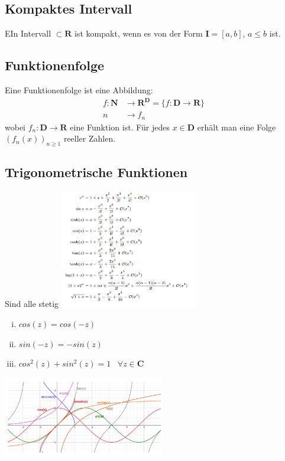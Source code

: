 \documentclass[8pt]{article}
\begin{document}
\begin{multicols*}{3}
\subsection{Kompaktes Intervall}

EIn Intervall $\subset \mathbf{R}$ ist kompakt, wenn es von der Form $\mathbf{I} = [a, b]$,
$a \leq b$ ist.

\subsection{Funktionenfolge}

Eine Funktionenfolge ist eine Abbildung:
\begin{align*}
  f:\mathbf{N} &\rightarrow \mathbf{R}^\mathbf{D} = \{f:\mathbf{D} \rightarrow \mathbf{R}\}\\
  n &\rightarrow f_n
\end{align*}
wobei $f_n: \mathbf{D} \rightarrow \mathbf{R}$ eine Funktion ist. Für jedes $x \in \mathbf{D}$
erhält man eine Folge $(f_n(x))_{n \geq 1}$ reeller Zahlen.

\subsection{Trigonometrische Funktionen}
Sind alle stetig
\includegraphics[width=6cm]{taylor.png}



\begin{enumerate}[(i)]
  \item $cos(z) = cos(-z)$
  \item $sin(-z) = -sin(z)$
  \item $cos^2(z) + sin^2(z) = 1 \;\;\; \forall z \in \mathbf{C}$
\end{enumerate}
\includegraphics[width=7cm]{functions.png}


\end{multicols*}
\end{document}
